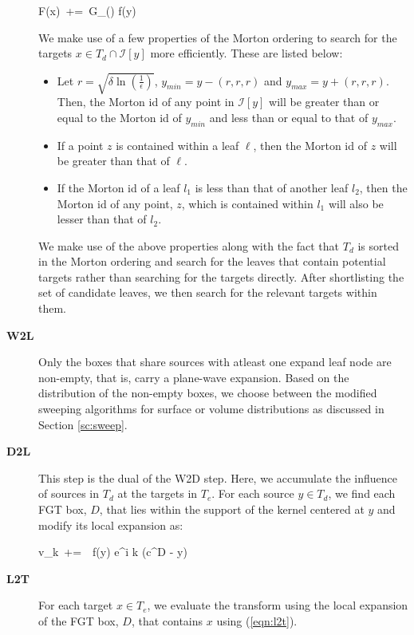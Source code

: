 \begin{description}
\beq F(x) \,+=\, G_\delta() f(y) \label{eqn:d2d} \eeq

We make use of a few properties of the Morton ordering to search for the targets $x \in T_d \cap \mathcal{I}[y]$ more efficiently. These
are listed below:
\begin{itemize}
\item Let $r = \sqrt{\delta \ln (\frac{1}{\epsilon})}$, $y_{min} = y - (r, r, r)$ and $y_{max} = y + (r, r, r)$. Then, the Morton id of any point in $\mathcal{I}[y]$ will be greater than or equal to the Morton id of $y_{min}$ and less than or equal to that of $y_{max}$.
\item If a point $z$ is contained within a leaf $\ell$, then the Morton id of $z$ will be greater than that of $\ell$.
\item If the Morton id of a leaf $l_1$ is less than that of another leaf $l_2$, then the Morton id of any point, $z$, which is
 contained within $l_1$ will also be lesser than that of $l_2$.
\end{itemize}

 We make use of the above properties along with the fact that $T_d$ is sorted in the Morton ordering and
 search for the leaves that contain potential targets rather than searching for the targets directly. After
 shortlisting the set of candidate leaves, we then search for the relevant targets within them.

\item[\textbf{W2L}] Only the boxes that share sources with atleast one expand leaf node are non-empty, that is,
 carry a plane-wave expansion. Based on the distribution of the non-empty boxes, we choose between the modified sweeping
 algorithms for surface or volume distributions as discussed in Section \ref{sc:sweep}. 

\item[\textbf{D2L}] This step is the dual of the W2D step. Here, we accumulate the influence of sources 
in $T_d$ at the targets in $T_e$. For each source $y \in T_d$, we find each FGT box, $D$, that lies within
 the support of the kernel centered at $y$ and modify its local expansion as: 

\beq v_k  \,+=\, \, f(y) e^{i \lambda k \cdot (c^D - y)} \label{eqn:d2l} \eeq

\item[\textbf{L2T}] For each target $x \in T_e$, we evaluate the transform using the local 
expansion of the FGT box, $D$, that contains $x$ using (\ref{eqn:l2t}).
\end{description}



